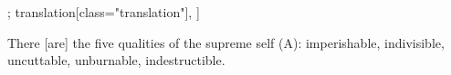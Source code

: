 \begin{alignment}[
  texts=edition[class="edition"];
  translation[class="translation"],
  ]
\begin{translation}
\begin{tlate}[p49_01]
There [are] the five qualities of the supreme self (A): imperishable, indivisible, uncuttable, unburnable, indestructible.\\
    \end{tlate}
  \end{translation}
\end{alignment}
\pagebreak %
